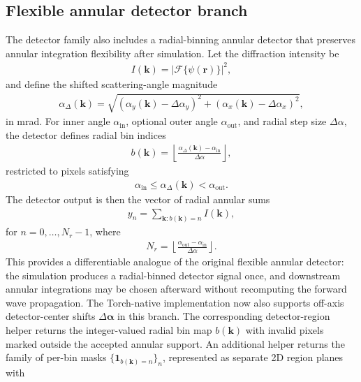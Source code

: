 \documentclass[11pt]{article}
\begin{document}
\subsection{Flexible annular detector branch}
The detector family also includes a radial-binning annular detector that preserves
annular integration flexibility after simulation.  Let the diffraction intensity be
\begin{align}
  I(\mathbf{k}) = \left|\mathcal{F}\{\psi(\mathbf{r})\}\right|^2,
\end{align}
and define the shifted scattering-angle magnitude
\begin{align}
  \alpha_\Delta(\mathbf{k}) =
  \sqrt{
    \left(\alpha_y(\mathbf{k})-\Delta\alpha_y\right)^2
    +
    \left(\alpha_x(\mathbf{k})-\Delta\alpha_x\right)^2
  },
\end{align}
in mrad.  For inner angle $\alpha_{\mathrm{in}}$, optional outer angle
$\alpha_{\mathrm{out}}$, and radial step size $\Delta \alpha$, the detector defines
radial bin indices
\begin{align}
  b(\mathbf{k}) =
  \left\lfloor
    \frac{\alpha_\Delta(\mathbf{k}) - \alpha_{\mathrm{in}}}{\Delta \alpha}
  \right\rfloor,
\end{align}
restricted to pixels satisfying
\begin{align}
  \alpha_{\mathrm{in}} \le \alpha_\Delta(\mathbf{k}) < \alpha_{\mathrm{out}}.
\end{align}
The detector output is then the vector of radial annular sums
\begin{align}
  y_n = \sum_{\mathbf{k}: b(\mathbf{k}) = n} I(\mathbf{k}),
\end{align}
for $n=0,\dots,N_r-1$, where
\begin{align}
  N_r = \left\lfloor
    \frac{\alpha_{\mathrm{out}} - \alpha_{\mathrm{in}}}{\Delta \alpha}
  \right\rfloor.
\end{align}
This provides a differentiable analogue of the original flexible annular detector:
the simulation produces a radial-binned detector signal once, and downstream annular
integrations may be chosen afterward without recomputing the forward wave propagation.
The Torch-native implementation now also supports off-axis detector-center shifts
$\Delta\boldsymbol{\alpha}$ in this branch.
The corresponding detector-region helper returns the integer-valued radial bin map
$b(\mathbf{k})$ with invalid pixels marked outside the accepted annular support.
An additional helper returns the family of per-bin masks
$\{\mathbf{1}_{b(\mathbf{k})=n}\}_n$, represented as separate 2D region planes with
\end{document}
